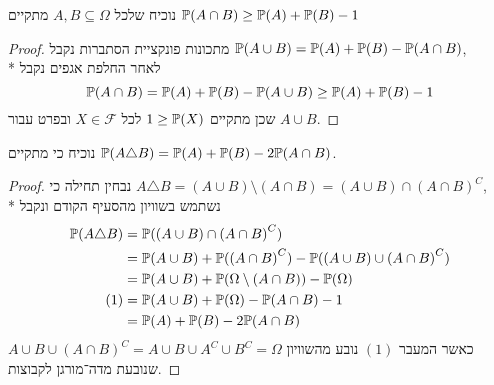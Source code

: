 \Subquestion{}
נוכיח שלכל $A, B \subseteq \Omega$ מתקיים $\mathbb{P}(A \cap B) \ge \mathbb{P}(A) + \mathbb{P}(B) - 1$
\begin{proof}
	מתכונות פונקציית הסתברות נקבל $\mathbb{P}(A \cup B) = \mathbb{P}(A) + \mathbb{P}(B) - \mathbb{P}(A \cap B)$, \\*
	לאחר החלפת אגפים נקבל
	\[
		\mathbb{P}(A \cap B) = \mathbb{P}(A) + \mathbb{P}(B) - \mathbb{P}(A \cup B) \ge \mathbb{P}(A) + \mathbb{P}(B) - 1
	\]
	שכן מתקיים $1 \ge \mathbb{P}(X)$ לכל $X \in \mathcal{F}$ ובפרט עבור $A \cup B$.
\end{proof}

\Subquestion{}
נוכיח כי מתקיים $\mathbb{P}(A \triangle B) = \mathbb{P}(A) + \mathbb{P}(B) - 2 \mathbb{P}(A \cap B)$.
\begin{proof}
	נבחין תחילה כי $A \triangle B = (A \cup B) \setminus (A \cap B) = (A \cup B) \cap {(A \cap B)}^C$, \\*
	נשתמש בשוויון מהסעיף הקודם ונקבל
	\begin{align*}
		\mathbb{P}(A \triangle B)
		& = \mathbb{P}((A \cup B) \cap {(A \cap B)}^C) \\
		& = \mathbb{P}(A \cup B) + \mathbb{P}({(A \cap B)}^C) - \mathbb{P}((A \cup B) \cup {(A \cap B)}^C) \\
		& = \mathbb{P}(A \cup B) + \mathbb{P}(\Omega \setminus (A \cap B)) - \mathbb{P}(\Omega) \\ \tag{1}
		& = \mathbb{P}(A \cup B) + \mathbb{P}(\Omega) - \mathbb{P}(A \cap B) - 1 \\
		& = \mathbb{P}(A) + \mathbb{P}(B) - 2 \mathbb{P}(A \cap B)
	\end{align*}
	כאשר המעבר $(1)$ נובע מהשוויון $A \cup B \cup {(A \cap B)}^C = A \cup B \cup A^C \cup B^C = \Omega$ שנובעת מדה־מורגן לקבוצות.
\end{proof}


